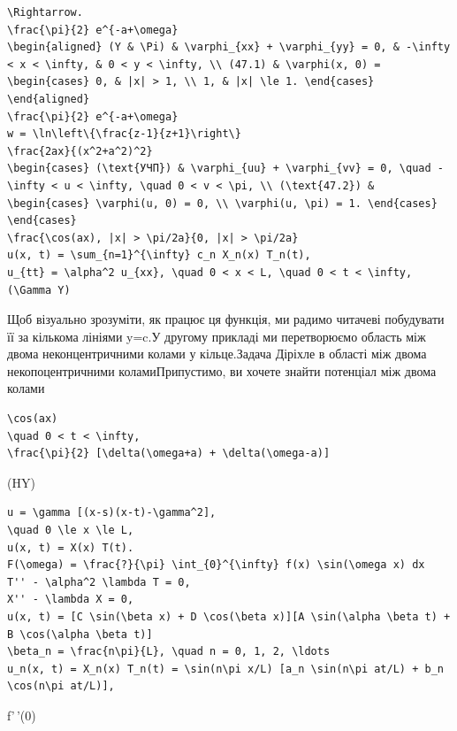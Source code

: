 \documentclass[
  ukrainian,
]{article}
\begin{document}
\begin{verbatim}
\Rightarrow.
\frac{\pi}{2} e^{-a+\omega}
\begin{aligned} (Y & \Pi) & \varphi_{xx} + \varphi_{yy} = 0, & -\infty < x < \infty, & 0 < y < \infty, \\ (47.1) & \varphi(x, 0) = \begin{cases} 0, & |x| > 1, \\ 1, & |x| \le 1. \end{cases} \end{aligned}
\frac{\pi}{2} e^{-a+\omega}
w = \ln\left\{\frac{z-1}{z+1}\right\}
\frac{2ax}{(x^2+a^2)^2}
\begin{cases} (\text{УЧП}) & \varphi_{uu} + \varphi_{vv} = 0, \quad -\infty < u < \infty, \quad 0 < v < \pi, \\ (\text{47.2}) & \begin{cases} \varphi(u, 0) = 0, \\ \varphi(u, \pi) = 1. \end{cases} \end{cases}
\frac{\cos(ax), |x| > \pi/2a}{0, |x| > \pi/2a}
u(x, t) = \sum_{n=1}^{\infty} c_n X_n(x) T_n(t),
u_{tt} = \alpha^2 u_{xx}, \quad 0 < x < L, \quad 0 < t < \infty,
(\Gamma Y)
\end{verbatim}

Щоб візуально зрозуміти, як працює ця функція, ми радимо читачеві
побудувати її за кількома лініями y=c.У другому прикладі ми перетворюємо
область між двома неконцентричними колами у кільце.Задача Діріхле в
області між двома некопоцентричними коламиПрипустимо, ви хочете знайти
потенціал між двома колами

\begin{verbatim}
\cos(ax)
\quad 0 < t < \infty,
\frac{\pi}{2} [\delta(\omega+a) + \delta(\omega-a)]
\end{verbatim}

(HY)

\begin{verbatim}
u = \gamma [(x-s)(x-t)-\gamma^2],
\quad 0 \le x \le L,
u(x, t) = X(x) T(t).
F(\omega) = \frac{?}{\pi} \int_{0}^{\infty} f(x) \sin(\omega x) dx
T'' - \alpha^2 \lambda T = 0,
X'' - \lambda X = 0,
u(x, t) = [C \sin(\beta x) + D \cos(\beta x)][A \sin(\alpha \beta t) + B \cos(\alpha \beta t)]
\beta_n = \frac{n\pi}{L}, \quad n = 0, 1, 2, \ldots
u_n(x, t) = X_n(x) T_n(t) = \sin(n\pi x/L) [a_n \sin(n\pi at/L) + b_n \cos(n\pi at/L)],
\end{verbatim}

f'\,'(0)
\end{document}
